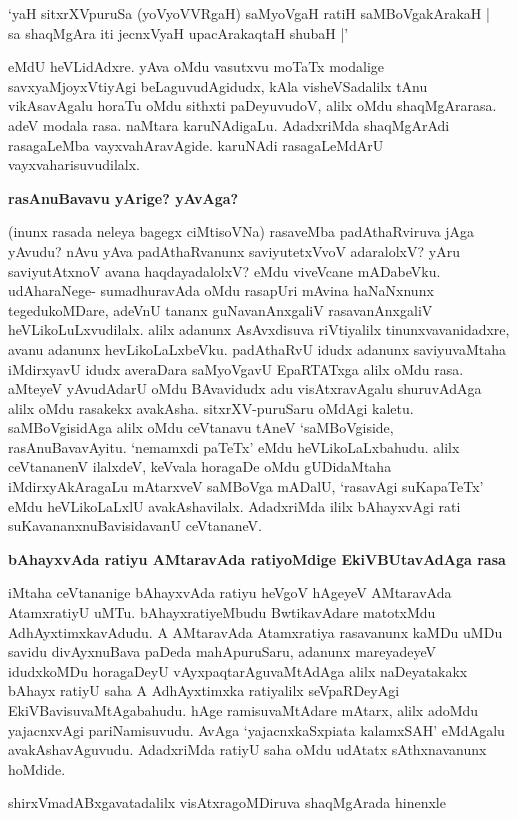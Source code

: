 \begin{shloka}
`yaH sitxrXVpuruSa (yoVyoVVRgaH) saMyoVgaH ratiH saMBoVgakArakaH |\\
sa shaqMgAra iti jecnxVyaH upacArakaqtaH shubaH |'
\end{shloka}

eMdU heVLidAdxre. yAva oMdu vasutxvu moTaTx modalige savxyaMjoyxVtiyAgi beLaguvudAgidudx, kAla visheVSadalilx tAnu vikAsavAgalu horaTu oMdu sithxti paDeyuvudoV, alilx oMdu shaqMgArarasa. adeV modala rasa. naMtara karuNAdigaLu. AdadxriMda shaqMgArAdi rasagaLeMba vayxvahAravAgide. karuNAdi rasagaLeMdArU vayxvaharisuvudilalx.

{\bf rasAnuBavavu yArige? yAvAga?}

(inunx rasada neleya bagegx ciMtisoVNa) rasaveMba padAthaRviruva jAga yAvudu? nAvu yAva padAthaRvanunx saviyutetxVvoV adaralolxV? yAru saviyutAtxnoV avana haqdayadalolxV? eMdu viveVcane mADabeVku. udAharaNege- sumadhuravAda oMdu rasapUri mAvina haNaNxnunx tegedukoMDare, adeVnU tananx guNavanAnxgaliV rasavanAnxgaliV heVLikoLuLxvudilalx. alilx adanunx AsAvxdisuva riVtiyalilx tinunxvavanidadxre, avanu adanunx hevLikoLaLxbeVku. padAthaRvU idudx adanunx saviyuvaMtaha iMdirxyavU idudx averaDara saMyoVgavU EpaRTATxga alilx oMdu rasa. aMteyeV yAvudAdarU oMdu BAvavidudx adu visAtxravAgalu shuruvAdAga alilx oMdu rasakekx avakAsha. sitxrXV-puruSaru oMdAgi kaletu. saMBoVgisidAga alilx oMdu ceVtanavu tAneV `saMBoVgiside, rasAnuBavavAyitu. `nemamxdi paTeTx' eMdu heVLikoLaLxbahudu. alilx ceVtananenV ilalxdeV, keVvala horagaDe oMdu gUDidaMtaha iMdirxyAkAragaLu mAtarxveV saMBoVga mADalU, `rasavAgi suKapaTeTx' eMdu heVLikoLaLxlU avakAshavilalx. AdadxriMda ililx bAhayxvAgi rati suKavananxnuBavisidavanU ceVtananeV.

{\bf bAhayxvAda ratiyu AMtaravAda ratiyoMdige EkiVBUtavAdAga rasa}

iMtaha ceVtananige bAhayxvAda ratiyu heVgoV hAgeyeV AMtaravAda AtamxratiyU uMTu. bAhayxratiyeMbudu BwtikavAdare matotxMdu AdhAyxtimxkavAdudu. A AMtaravAda Atamxratiya rasavanunx kaMDu uMDu savidu divAyxnuBava paDeda mahApuruSaru, adanunx mareyadeyeV idudxkoMDu horagaDeyU vAyxpaqtarAguvaMtAdAga alilx naDeyatakakx bAhayx ratiyU saha A AdhAyxtimxka ratiyalilx seVpaRDeyAgi EkiVBavisuvaMtAgabahudu. hAge ramisuvaMtAdare mAtarx, alilx adoMdu yajacnxvAgi pariNamisuvudu. AvAga `yajacnxkaSxpiata kalamxSAH' eMdAgalu avakAshavAguvudu. AdadxriMda ratiyU saha oMdu udAtatx sAthxnavanunx hoMdide.

{shirxVmadABxgavatadalilx visAtxragoMDiruva shaqMgArada hinenxle}

